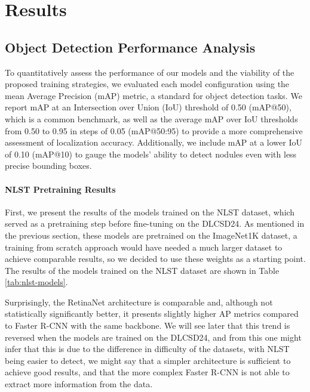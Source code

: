 \chapter{Results}
\label{chap:results}
\section{Object Detection Performance Analysis}

To quantitatively assess the performance of our models and the viability of the proposed training strategies, we evaluated each model configuration using the mean Average Precision (mAP) metric, a standard for object detection tasks. We report mAP at an Intersection over Union (IoU) threshold of 0.50 (mAP@50), which is a common benchmark, as well as the average mAP over IoU thresholds from 0.50 to 0.95 in steps of 0.05 (mAP@50:95) to provide a more comprehensive assessment of localization accuracy. Additionally, we include mAP at a lower IoU of 0.10 (mAP@10) to gauge the models' ability to detect nodules even with less precise bounding boxes.

\subsubsection{NLST Pretraining Results}
First, we present the results of the models trained on the NLST dataset, which served as a pretraining step before fine-tuning on the DLCSD24.
As mentioned in the previous section, these models are pretrained on the ImageNet1K dataset, a training from scratch approach would have needed a much larger dataset to achieve comparable results, so we decided to use these weights as a starting point.
The results of the models trained on the NLST dataset are shown in Table \ref{tab:nlst-models}.



Surprisingly, the RetinaNet architecture is comparable and, although not statistically significantly better, it presents slightly higher AP metrics compared to Faster R-CNN with the same backbone.
We will see later that this trend is reversed when the models are trained on the DLCSD24, and from this one might infer that this is due to the difference in difficulty of the datasets, with NLST being easier to detect, we might say that a simpler architecture is sufficient to achieve good results, and that the more complex Faster R-CNN is not able to extract more information from the data.

